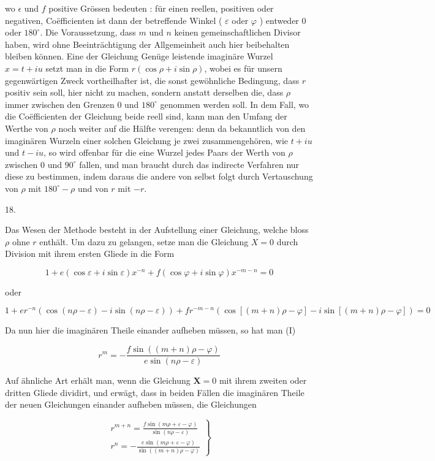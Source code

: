 \documentclass[10pt]{article}
\begin{document}
wo \(\epsilon\) und \(f\) positive Grössen bedeuten : für einen reellen, positiven oder negativen, Coëfficienten ist dann der betreffende Winkel ( \(\varepsilon\) oder \(\varphi\) ) entweder 0 oder \(180^{\circ}\). Die Voraussetzung, dass \(m\) und \(n\) keinen gemeinschaftlichen Divisor haben, wird ohne Beeinträchtigung der Allgemeinheit auch hier beibehalten bleiben können. Eine der Gleichung Genüge leistende imaginäre Wurzel \(x=t+i u\) setzt man in die Form \(r(\cos \rho+i \sin \rho)\), wobei es für unsern gegenwärtigen Zweck
vortheilhafter ist, die sonst gewöhnliche Bedingung, dass \(r\) positiv sein soll, hier nicht zu machen, sondern anstatt derselben die, dass \(\rho\) immer zwischen den Grenzen 0 und \(180^{\circ}\) genommen werden soll. In dem Fall, wo die Coëfficienten der Gleichung beide reell sind, kann man den Umfang der Werthe von \(\rho\) noch weiter auf die Hälfte verengen: denn da bekanntlich von den imaginären Wurzeln einer solchen Gleichung je zwei zusammengehören, wie \(t+i u\) und \(t-i u\), so wird offenbar für die eine Wurzel jedes Paars der Werth von \(\rho\) zwischen 0 und \(90^{\circ}\) fallen, und man braucht durch das indirecte Verfahren nur diese zu bestimmen, indem daraus die andere von selbst folgt durch Vertauschung von \(\rho\) mit \(180^{\circ}-\rho\) und von \(r\) mit \(-r\).

18.

Das Wesen der Methode besteht in der Aufstellung einer Gleichung, welche bloss \(\rho\) ohne \(r\) enthält. Um dazu zu gelangen, setze man die Gleichung \(X=0\) durch Division mit ihrem ersten Gliede in die Form

\[
1+e(\cos \varepsilon+i \sin \varepsilon) x^{-n}+f(\cos \varphi+i \sin \varphi) x^{-m-n}=0
\]

oder

\(1+e r^{-n}(\cos (n \rho-\varepsilon)-i \sin (n \rho-\varepsilon))+f r^{-m-n}(\cos [(m+n) \rho-\varphi]-i \sin [(m+n) \rho-\varphi])=0\)

Da nun hier die imaginären Theile einander aufheben müssen, so hat man (I)

\[
r^{m}=-\frac{f \sin ((m+n) \rho-\varphi)}{e \sin (n \rho-\varepsilon)}
\]

Auf ähnliche Art erhält man, wenn die Gleichung \(\boldsymbol{X}=0\) mit ihrem zweiten oder dritten Gliede dividirt, und erwägt, dass in beiden Fällen die imaginären Theile der neuen Gleichungen einander aufheben müssen, die Gleichungen

\[
\left.\begin{array}{l}
r^{m+n}=\frac{f \sin (m \rho+\varepsilon-\varphi)}{\sin (n \rho-\varepsilon)} \\
r^{n}=-\frac{e \sin (m \rho+\varepsilon-\varphi)}{\sin ((m+n) \rho-\varphi)}
\end{array}\right\}
\]
\end{document}
